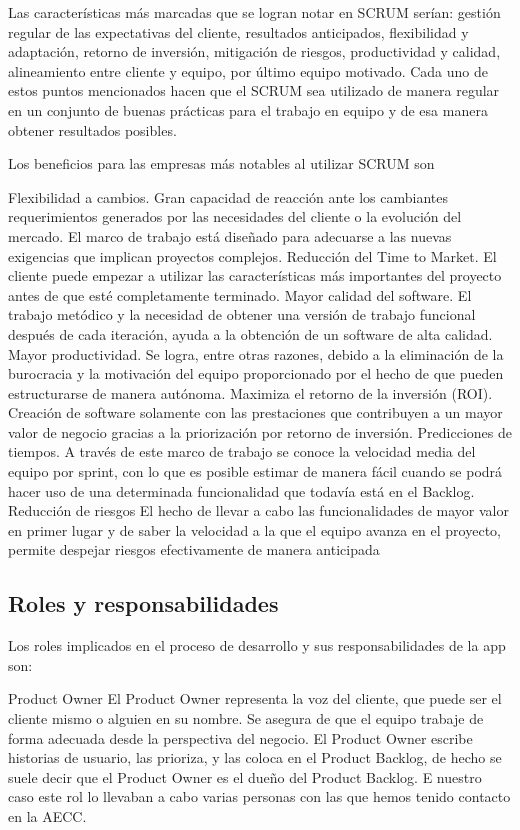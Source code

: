 \documentclass[../pfc.tex]{subfiles}
\begin{document}
	Las características más marcadas que se logran notar en SCRUM serían: gestión regular de las expectativas del cliente, resultados anticipados, flexibilidad y adaptación, retorno de inversión, mitigación de riesgos, productividad y calidad, alineamiento entre cliente y equipo, por último equipo motivado. Cada uno de estos puntos mencionados hacen que el SCRUM sea utilizado de manera regular en un conjunto de buenas prácticas para el trabajo en equipo y de esa manera obtener resultados posibles.
	
	Los beneficios para las empresas más notables al utilizar SCRUM son

	Flexibilidad a cambios. Gran capacidad de reacción ante los cambiantes requerimientos generados por las necesidades del cliente o la evolución del mercado. El marco de trabajo está diseñado para adecuarse a las nuevas exigencias que implican proyectos complejos.
	Reducción del Time to Market. El cliente puede empezar a utilizar las características más importantes del proyecto antes de que esté completamente terminado.
	Mayor calidad del software. El trabajo metódico y la necesidad de obtener una versión de trabajo funcional después de cada iteración, ayuda a la obtención de un software de alta calidad.
	Mayor productividad. Se logra, entre otras razones, debido a la eliminación de la burocracia y la motivación del equipo proporcionado por el hecho de que pueden estructurarse de manera autónoma.
	Maximiza el retorno de la inversión (ROI). Creación de software solamente con las prestaciones que contribuyen a un mayor valor de negocio gracias a la priorización por retorno de inversión.
	Predicciones de tiempos. A través de este marco de trabajo se conoce la velocidad media del equipo por sprint, con lo que es posible estimar de manera fácil cuando se podrá hacer uso de una determinada funcionalidad que todavía está en el Backlog.
	Reducción de riesgos El hecho de llevar a cabo las funcionalidades de mayor valor en primer lugar y de saber la velocidad a la que el equipo avanza en el proyecto, permite despejar riesgos efectivamente de manera anticipada
	
	\subsection{Roles y responsabilidades}
	Los roles  implicados en el proceso de desarrollo y sus responsabilidades   de la app son:

	Product Owner
	El Product Owner representa la voz del cliente, que puede ser el cliente mismo o alguien en su nombre. Se asegura de que el equipo trabaje de forma adecuada desde la perspectiva del negocio. El Product Owner escribe historias de usuario, las prioriza, y las coloca en el Product Backlog, de hecho se suele decir que el Product Owner es el dueño del Product Backlog. E nuestro caso este rol lo llevaban a cabo varias personas con las que hemos tenido contacto en la AECC.
	
\end{document}
